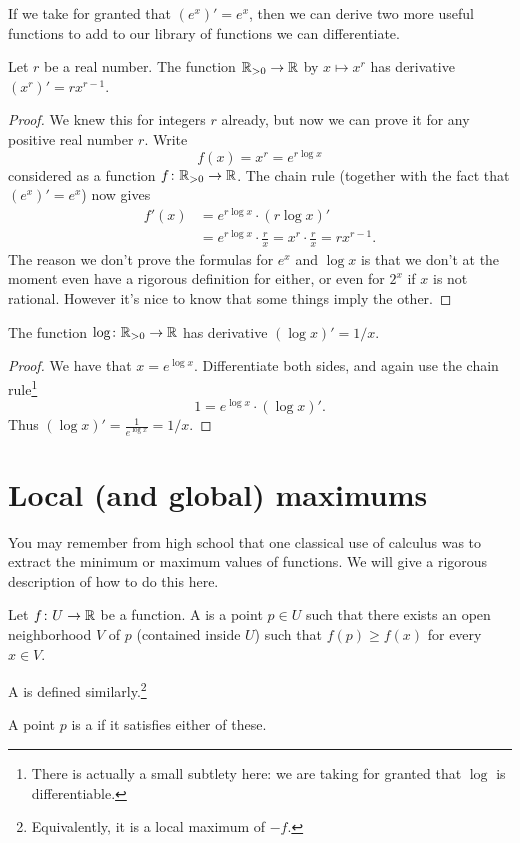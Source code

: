 If we take for granted that $(e^x)' = e^x$,
then we can derive two more useful functions
to add to our library of functions we can differentiate.
\begin{corollary}
	Let $r$ be a real number.
	The function $\mathbb R_{>0} \to \mathbb R$ by $x \mapsto x^r$
	has derivative $(x^r)' = rx^{r-1}$.
\end{corollary}

\begin{proof}
	We knew this for integers $r$ already,
	but now we can prove it for any positive real number $r$.
	Write
	\[ f(x) = x^r = e^{r \log x} \]
	considered as a function $f \colon \mathbb R_{>0} \to \mathbb R$.
	The chain rule (together with the fact that $(e^x)' = e^x$)
	now gives
	\begin{align*}
		f'(x) &= e^{r \log x} \cdot (r \log x)' \\
		&= e^{r \log x} \cdot \frac rx = x^r \cdot \frac rx = rx^{r-1}.
	\end{align*}
	The reason we don't prove the formulas for $e^x$ and $\log x$
	is that we don't at the moment even have a rigorous
	definition for either, or even for $2^x$ if $x$ is not rational.
	However it's nice to know that some things imply the other.
\end{proof}
\begin{corollary}
	The function $\log \colon \mathbb R_{>0} \to \mathbb R$
	has derivative $(\log x)' = 1/x$.
\end{corollary}
\begin{proof}
	We have that $x = e^{\log x}$.
	Differentiate both sides, and again use the chain rule\footnote{There
		is actually a small subtlety here:
		we are taking for granted that $\log$ is differentiable.}
	\[ 1 = e^{\log x} \cdot (\log x)'. \]
	Thus $(\log x)' = \frac{1}{e^{\log x}} = 1/x$.
\end{proof}

\section{Local (and global) maximums}
You may remember from high school
that one classical use of calculus
was to extract the minimum or maximum values of functions.
We will give a rigorous description of how to do this here.

\begin{definition}
	Let $f \colon U \to \mathbb R$ be a function.
	A  is a point $p \in U$
	such that there exists an open neighborhood $V$ of $p$
	(contained inside $U$)
	such that $f(p) \ge f(x)$ for every $x \in V$.

	A  is defined similarly.\footnote{Equivalently,
		it is a local maximum of $-f$.}
\end{definition}
\begin{definition}
	A point $p$ is a 
	if it satisfies either of these.
\end{definition}

